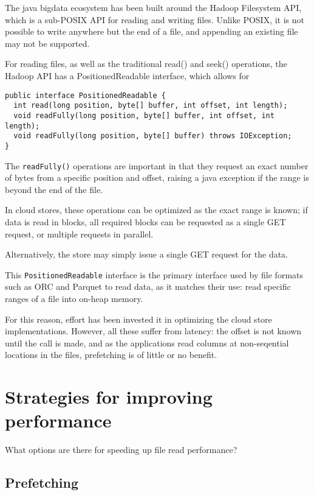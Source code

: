 \documentclass[manuscript]{acmart}
\begin{document}
The java bigdata ecosystem has been built around the Hadoop Filesystem API,
which is a sub-POSIX API for reading and writing files.
Unlike POSIX, it is not possible to write anywhere but the end of a file,
and appending an existing file may not be supported.

For reading files, as well as the traditional read() and seek() operations,
the Hadoop API has a PositionedReadable interface, which allows for

\begin{verbatim}
public interface PositionedReadable {
  int read(long position, byte[] buffer, int offset, int length);
  void readFully(long position, byte[] buffer, int offset, int length);
  void readFully(long position, byte[] buffer) throws IOException;
}
\end{verbatim}

The \texttt{readFully()} operations are important in that they
request an exact number of bytes from a specific position and offset,
raising a java exception if the range is beyond the end of the file.

In cloud stores, these operations can be optimized as the exact range is known;
if data is read in blocks, all required blocks can be requested as
a single GET request, or multiple requests in parallel.

Alternatively, the store may simply issue a single GET request for the data.

This \texttt{PositionedReadable} interface is the primary interface
used by file formats such as ORC and Parquet to read data, as it matches
their use: read specific ranges of a file into on-heap memory.

For this reason, effort has been invested it in optimizing the
cloud store implementations.
However, all these suffer from latency: the offset is not known until
the call is made, and as the applications read columns at non-seqential
locations in the files, prefetching is of little or no benefit.


\section{Strategies for improving performance}\label{sec:strategies-for-improving-performance}

What options are there for speeding up file read performance?

\subsection{Prefetching}\label{subsec:prefetching}
\end{document}
